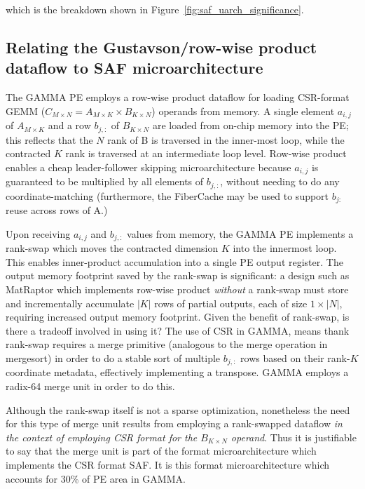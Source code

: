 which is the breakdown shown in Figure~\ref{fig:saf_uarch_significance}.

\subsection{Relating the Gustavson/row-wise product dataflow to SAF microarchitecture}

The GAMMA PE employs a row-wise product dataflow for loading CSR-format GEMM ($C_{M\times N} = A_{M\times K} \times B_{K\times N}$) operands from memory. A single element $a_{i,j}$ of $A_{M\times K}$ and a row $b_{j,:}$ of $B_{K\times N}$ are loaded from on-chip memory into the PE; this reflects that the $N$ rank of B is traversed in the inner-most loop, while the contracted $K$ rank is traversed at an intermediate loop level. Row-wise product enables a cheap leader-follower skipping microarchitecture because $a_{i,j}$ is guaranteed to be multiplied by all elements of $b_{j,:}$, without needing to do any coordinate-matching (furthermore, the FiberCache\cite{gamma} may be used to support $b_{j:}$ reuse across rows of A.) 

Upon receiving $a_{i,j}$ and $b_{j,:}$ values from memory, the GAMMA PE implements a rank-swap which moves the contracted dimension $K$ into the innermost loop. This enables inner-product accumulation into a single PE output register. The output memory footprint saved by the rank-swap is significant: a design such as MatRaptor\cite{matraptor} which implements row-wise product \textit{without} a rank-swap must store and incrementally accumulate $|K|$ rows of partial outputs, each of size $1 \times |N|$, requiring increased output memory footprint. Given the benefit of rank-swap, is there a tradeoff involved in using it? The use of CSR in GAMMA, means thank rank-swap requires a merge primitive (analogous to the merge operation in mergesort) in order to do a stable sort of multiple $b_{j,:}$ rows based on their rank-$K$ coordinate metadata, effectively implementing a transpose. GAMMA employs a radix-64 merge unit\cite{gamma} in order to do this. 

Although the rank-swap itself is not a sparse optimization, nonetheless the need for this type of merge unit results from employing a rank-swapped dataflow \textit{in the context of employing CSR format for the $B_{K\times N}$ operand}. Thus it is justifiable to say that the merge unit is part of the format microarchitecture which implements the CSR format SAF. It is this format microarchitecture which accounts for 30\% of PE area in GAMMA.

